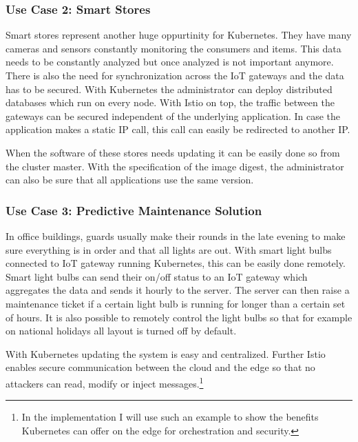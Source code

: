\subsubsection{Use Case 2: Smart Stores}
Smart stores represent another huge oppurtinity for Kubernetes. They have many cameras and sensors constantly monitoring the consumers and items. This data needs to be constantly analyzed but once analyzed is not important anymore. There is also the need for synchronization across the IoT gateways and the data has to be secured. With Kubernetes the administrator can deploy distributed databases which run on every node. With Istio on top, the traffic between the gateways can be secured independent of the underlying application. In case the application makes a static IP call, this call can easily be redirected to another IP.

When the software of these stores needs updating it can be easily done so from the cluster master. With the specification of the image digest, the administrator can also be sure that all applications use the same version.

\subsubsection{Use Case 3: Predictive Maintenance Solution}
In office buildings, guards usually make their rounds in the late evening to make sure everything is in order and that all lights are out. With smart light bulbs connected to IoT gateway running Kubernetes, this can be easily done remotely. Smart light bulbs can send their on/off status to an IoT gateway which aggregates the data and sends it hourly to the server. The server can then raise a maintenance ticket if a certain light bulb is running for longer than a certain set of hours. It is also possible to remotely control the light bulbs so that for example on national holidays all layout is turned off by default.

With Kubernetes updating the system is easy and centralized. Further Istio enables secure communication between the cloud and the edge so that no attackers can read, modify or inject messages.\footnote{In the implementation I will use such an example to show the benefits Kubernetes can offer on the edge for orchestration and security.}

